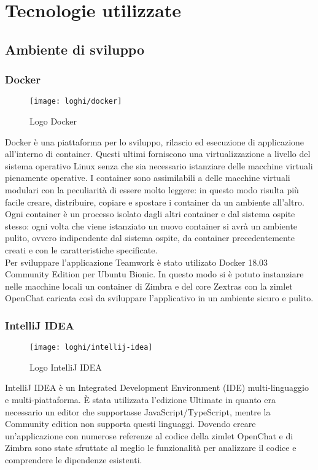 
\chapter{Tecnologie utilizzate}\label{chap:tec}
\section{Ambiente di sviluppo}
\subsection{Docker}
	\begin{figure}[H] 
		\centering
		\texttt{[image: loghi/docker]}
		\caption{Logo Docker}
	\end{figure}
Docker è una piattaforma per lo sviluppo, rilascio ed esecuzione di applicazione 
all'interno di container. Questi ultimi forniscono una virtualizzazione a livello 
del sistema operativo Linux senza che sia necessario istanziare delle macchine 
virtuali pienamente operative.
I container sono assimilabili a delle macchine virtuali modulari con la peculiarità 
di essere molto leggere: in questo modo risulta più facile creare, distribuire, 
copiare e spostare i container da un ambiente all'altro.
Ogni container è un processo isolato dagli altri container e dal sistema ospite 
stesso:  ogni volta che viene istanziato un nuovo container si avrà un ambiente 
pulito, ovvero indipendente dal sistema ospite, da container precedentemente 
creati e con le caratteristiche specificate. \\
Per sviluppare l'applicazione Teamwork è stato utilizato Docker 18.03 Community 
Edition per Ubuntu Bionic. In questo modo si è potuto instanziare nelle macchine 
locali un container di Zimbra e del core Zextras con la zimlet OpenChat caricata 
così da sviluppare l'applicativo in un ambiente sicuro e pulito.

\subsection{IntelliJ IDEA} \label{subsec:IntelliJ}
	\begin{figure}[H] 
		\centering
		\texttt{[image: loghi/intellij-idea]}
		\caption{Logo IntelliJ IDEA}
	\end{figure}
IntelliJ IDEA è un Integrated Development Environment (IDE) multi-linguaggio e 
multi-piattaforma. 
È stata utilizzata l'edizione Ultimate in quanto era necessario un editor che 
supportasse JavaScript/TypeScript, mentre la Community edition non supporta 
questi linguaggi. 
Dovendo creare un'applicazione con numerose referenze al codice della zimlet 
OpenChat e di Zimbra sono state sfruttate al meglio le funzionalità per 
analizzare il codice e comprendere le dipendenze esistenti.

